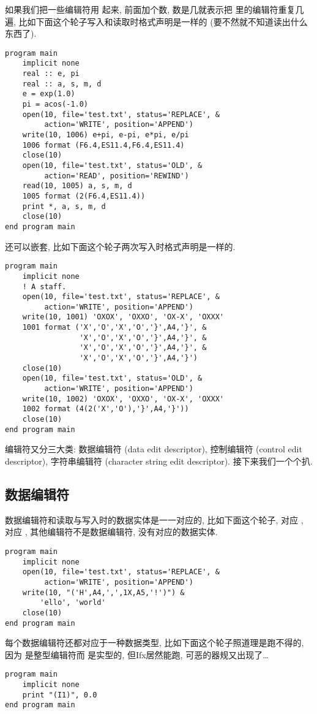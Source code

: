 如果我们把一些编辑符用 \ttt{()} 起来, 前面加个数, 数是几就表示把 \ttt{()} 里的编辑符重复几遍, 比如下面这个轮子写入和读取时格式声明是一样的 (要不然就不知道读出什么东西了). 
\begin{lstlisting}
program main
    implicit none
    real :: e, pi
    real :: a, s, m, d
    e = exp(1.0)
    pi = acos(-1.0)
    open(10, file='test.txt', status='REPLACE', &
         action='WRITE', position='APPEND')
    write(10, 1006) e+pi, e-pi, e*pi, e/pi
    1006 format (F6.4,ES11.4,F6.4,ES11.4)
    close(10)
    open(10, file='test.txt', status='OLD', &
         action='READ', position='REWIND')
    read(10, 1005) a, s, m, d
    1005 format (2(F6.4,ES11.4))
    print *, a, s, m, d
    close(10)
end program main
\end{lstlisting}
\ttt{()} 还可以嵌套, 比如下面这个轮子两次写入时格式声明是一样的. 
\begin{lstlisting}
program main
    implicit none
    ! A staff. 
    open(10, file='test.txt', status='REPLACE', &
         action='WRITE', position='APPEND')
    write(10, 1001) 'OXOX', 'OXXO', 'OX-X', 'OXXX'
    1001 format ('X','O','X','O','}',A4,'}', &
                 'X','O','X','O','}',A4,'}', &
                 'X','O','X','O','}',A4,'}', &
                 'X','O','X','O','}',A4,'}')
    close(10)
    open(10, file='test.txt', status='OLD', &
         action='WRITE', position='APPEND')
    write(10, 1002) 'OXOX', 'OXXO', 'OX-X', 'OXXX'
    1002 format (4(2('X','O'),'}',A4,'}'))
    close(10)
end program main
\end{lstlisting}

编辑符又分三大类: 数据编辑符 (data edit descriptor), 控制编辑符 (control edit descriptor), 字符串编辑符 (character string edit descriptor). 接下来我们一个个扒. 

\subsection{数据编辑符}

数据编辑符和读取与写入时的数据实体是一一对应的, 比如下面这个轮子,  对应 ,  对应 , 其他编辑符不是数据编辑符, 没有对应的数据实体. 
\begin{lstlisting}
program main
    implicit none
    open(10, file='test.txt', status='REPLACE', &
         action='WRITE', position='APPEND')
    write(10, "('H',A4,',',1X,A5,'!')") &
        'ello', 'world'
    close(10)
end program main
\end{lstlisting}
每个数据编辑符还都对应于一种数据类型, 比如下面这个轮子照道理是跑不得的, 因为  是整型编辑符而  是实型的, 但Ifx居然能跑, 可恶的器规又出现了\dots{}
\begin{lstlisting}
program main
    implicit none
    print "(I1)", 0.0
end program main
\end{lstlisting}

